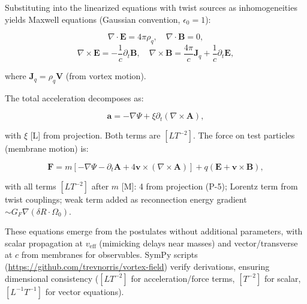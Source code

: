 Substituting into the linearized equations with twist sources as inhomogeneities yields Maxwell equations (Gaussian convention, $\epsilon_0 = 1$):

\begin{equation}
\nabla \cdot \mathbf{E} = 4\pi \rho_q, \quad \nabla \cdot \mathbf{B} = 0,
\end{equation}
\begin{equation}
\nabla \times \mathbf{E} = -\frac{1}{c} \partial_t \mathbf{B}, \quad \nabla \times \mathbf{B} = \frac{4\pi}{c} \mathbf{J}_q + \frac{1}{c} \partial_t \mathbf{E},
\end{equation}

where $\mathbf{J}_q = \rho_q \mathbf{V}$ (from vortex motion).

The total acceleration decomposes as:

\begin{equation}
\mathbf{a} = -\nabla \Psi + \xi \partial_t (\nabla \times \mathbf{A}),
\end{equation}

with $\xi$ [L] from projection. Both terms are $[L T^{-2}]$. The force on test particles (membrane motion) is:

\begin{equation}
\mathbf{F} = m \left[ -\nabla \Psi - \partial_t \mathbf{A} + 4 \mathbf{v} \times (\nabla \times \mathbf{A}) \right] + q \left( \mathbf{E} + \mathbf{v} \times \mathbf{B} \right),
\end{equation}

with all terms $[L T^{-2}]$ after $m$ [M]: 4 from projection (P-5); Lorentz term from twist couplings; weak term added as reconnection energy gradient $\sim G_F \nabla (\delta R \cdot \Omega_0)$.

These equations emerge from the postulates without additional parameters, with scalar propagation at $v_{\text{eff}}$ (mimicking delays near masses) and vector/transverse at $c$ from membranes for observables. SymPy scripts (\url{https://github.com/trevnorris/vortex-field}) verify derivations, ensuring dimensional consistency ($[L T^{-2}]$ for acceleration/force terms, $[T^{-2}]$ for scalar, $[L^{-1} T^{-1}]$ for vector equations).

